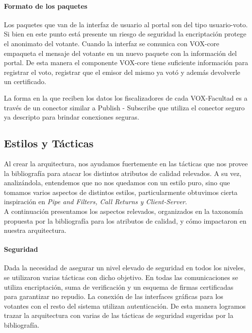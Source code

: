\paragraph{Formato de los paquetes} Los paquetes que van de la interfaz de usuario al portal son del tipo usuario-voto. Si bien en este punto está presente un riesgo de seguridad la encriptación protege el anonimato del votante. Cuando la interfaz se comunica con VOX-core empaqueta el mensaje del votante en un nuevo paquete con la información del portal. De esta manera el componente VOX-core tiene suficiente información para registrar el voto, registrar que el emisor del mismo ya votó y además devolverle un certificado.


La forma en la que reciben los datos los fiscalizadores de cada VOX-Facultad es a través de un conector similar a Publish - Subscribe que utiliza el conector seguro ya descripto para brindar conexiones seguras.


\subsection{Estilos y Tácticas}

Al crear la arquitectura, nos ayudamos fuertemente en las tácticas que nos provee la bibliografía para atacar los distintos atributos de calidad relevados. A su vez, analizándola, entendemos que no nos quedamos con un estilo puro, sino que tomamos varios aspectos de distintos estilos, particularmente obtuvimos cierta inspiración en \textit{Pipe and Filters, Call Returns y Client-Server}. \\ A continuación presentamos los aspectos relevados, organizados en la taxonomía propuesta por la bibliografía para los atributos de calidad, y cómo impactaron en nuestra arquitectura.
 


\paragraph{Seguridad}
Dada la necesidad de asegurar un nivel elevado de seguridad en todos los niveles, se utilizaron varias tácticas con dicho objetivo. En todas las comunicaciones se utiliza encriptación, suma de verificación y un esquema de firmas certificadas para garantizar no repudio. La conexión de las interfaces gráficas para los votantes con el resto del sistema utilizan autenticación. De esta manera logramos trazar la arquitectura con varias de las tácticas de seguridad sugeridas por la bibliografía.

